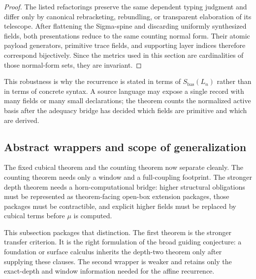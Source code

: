 \begin{proof}
The listed refactorings preserve the same dependent typing judgment and differ only by
canonical rebracketing, rebundling, or transparent elaboration of its telescope.  After
flattening the Sigma-spine and discarding uniformly synthesized fields, both presentations
reduce to the same counting normal form.  Their atomic payload generators, primitive trace
fields, and supporting layer indices therefore correspond bijectively.  Since the metrics used
in this section are cardinalities of those normal-form sets, they are invariant.
\end{proof}

This robustness is why the recurrence is stated in terms of \(S_{\mathrm{bas}}(L_n)\) rather
than in terms of concrete syntax.  A source language may expose a single record with many
fields or many small declarations; the theorem counts the normalized active basis after the
adequacy bridge has decided which fields are primitive and which are derived.

\subsection{Abstract wrappers and scope of generalization}
\label{subsec:abstract-wrappers}

The fixed cubical theorem and the counting theorem now separate cleanly.  The counting theorem
needs only a window and a full-coupling footprint.  The stronger depth theorem needs a
horn-computational bridge: higher structural obligations must be represented as theorem-facing
open-box extension packages, those packages must be contractible, and explicit higher fields
must be replaced by cubical terms before \(\mu\) is computed.

This subsection packages that distinction.  The first theorem is the stronger transfer
criterion.  It is the right formulation of the broad guiding conjecture: a foundation or
surface calculus inherits the depth-two theorem only after supplying these clauses.  The second
wrapper is weaker and retains only the exact-depth and window information needed for the
affine recurrence.

